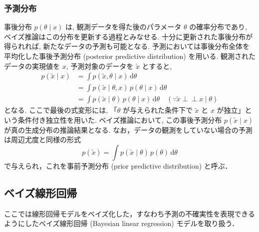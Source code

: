 \documentclass[titlepage]{ltjsbook}
\begin{document}
\subsubsection{予測分布}
事後分布 $p(\theta \mid x)$ は, 観測データを得た後のパラメータ $\theta$ の確率分布であり, ベイズ推論はこの分布を更新する過程とみなせる. 十分に更新された事後分布が得られれば, 新たなデータの予測も可能となる. 予測においては事後分布全体を平均化した事後予測分布 (posterior predictive distribution) を用いる. 観測されたデータの実現値を $x$, 予測対象のデータを $\tilde{x}$ とすると, 
\begin{align}
p(\tilde{x} \mid x)
&= \int p(\tilde{x}, \theta \mid x) \, \mathrm{d}\theta\\
&= \int p(\tilde{x} \mid \theta, x) \, p(\theta \mid x) \, \mathrm{d}\theta \\
&= \int p(\tilde{x} \mid \theta) \, p(\theta \mid x) \, \mathrm{d}\theta
\quad (\because \tilde{x} \perp\!\!\!\perp x \mid \theta)
\end{align}
となる. ここで最後の式変形には, 「$\theta$ が与えられた条件下で $\tilde{x}$ と $x$ が独立」という条件付き独立性を用いた. ベイズ推論において, この事後予測分布 $p(\tilde{x} \mid x)$ が真の生成分布の推論結果となる. なお，データの観測をしていない場合の予測は周辺尤度と同様の形式
\begin{equation}
p(\tilde{x}) = \int p(\tilde{x} \mid \theta)\, p(\theta)\, \mathrm{d}\theta
\end{equation}
で与えられ，これを事前予測分布 (prior predictive distribution) と呼ぶ．

\subsection{ベイズ線形回帰}
ここでは線形回帰モデルをベイズ化した，すなわち予測の不確実性を表現できるようにしたベイズ線形回帰 (Bayesian linear regression) モデルを取り扱う．
\end{document}
